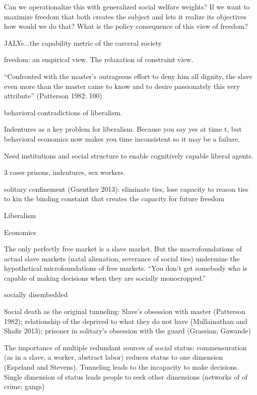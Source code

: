 \documentclass[10pt,a4paper]{article}
\begin{document}
Can we operationalize this with generalized social welfare weights? If we want to maximize freedom that both creates the
subject and lets it realize its objectives how would we do that? What is the policy consequence of this view of freedom?

JALYs...the capability metric of the carceral society


freedom: an empirical view. The relaxation of constraint view.

``Confronted with the master's outrageous effort to deny him all dignity, the slave even more than the master came 
to know and to desire passionately this very attribute'' (Patterson 1982: 100)

behavioral contradictions of liberalism.

Indentures as a key problem for liberalism. Because you say yes at time t, but behavioral economics now makes you time inconsistent
so it may be a failure.

Need institutions and social structure to enable cognitively capable liberal agents.

3 cases
prisons, indentures, sex workers.

solitary confinement (Guenther 2013): eliminate ties, lose capacity to reason
ties to kin the binding constaint that creates the capacity for future freedom

Liberalism



Economics
 
 The only perfectly free market is a slave market. But the macrofoundations of actual slave markets 
 (natal alienation, severance of social ties) undermine the hypothetical microfoundations of free markets. 
 ``You don't get somebody who is capable of making decisions when they are socially monocropped.''
 
 socially disembedded
 
 Social death as the original tunneling: Slave's obsession with master (Patterson 1982); 
 relationship of the deprived to what they do not have (Mullainathan and Shafir 2013); prisoner 
 in solitary's obsession with the guard (Grassian; Gawande)
 
 The importance of multiple redundant sources of social status: commensuration (as in a slave, a worker, 
 abstract labor) reduces status to one dimension (Espeland and Stevens). Tunneling leads to the incapacity 
 to make decisions. Single dimension of status leads people to seek other dimensions (networks of 
 of crime; gangs) 
 
\end{document}
